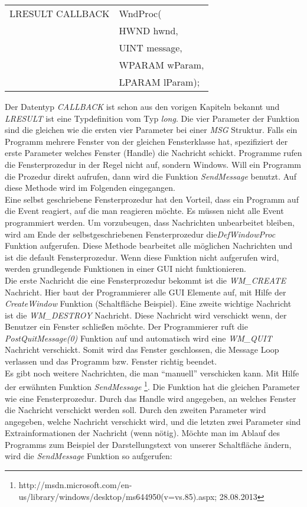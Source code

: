 \begin{tabular}{ll}
LRESULT CALLBACK & WndProc(\\
& HWND hwnd,\\
& UINT message,\\
& WPARAM wParam,\\
& LPARAM lParam);
\end{tabular}

Der Datentyp \textit{CALLBACK} ist schon aus den vorigen Kapiteln bekannt und \textit{LRESULT} ist eine Typdefinition vom Typ \textit{long}. Die vier Parameter der Funktion sind die gleichen wie die ersten vier Parameter bei einer \textit{MSG} Struktur. Falls ein Programm mehrere Fenster von der gleichen Fensterklasse hat, spezifiziert der erste Parameter welches Fenster (Handle) die Nachricht schickt. Programme rufen die Fensterprozedur in der Regel nicht auf, sondern Windows. Will ein Programm die Prozedur direkt aufrufen, dann wird die Funktion \textit{SendMessage} benutzt. Auf diese Methode wird im Folgenden eingegangen.
\\

Eine selbst geschriebene Fensterprozedur hat den Vorteil, dass ein Programm auf die Event reagiert, auf die man reagieren möchte. Es müssen nicht alle Event programmiert werden. Um vorzubeugen, dass Nachrichten unbearbeitet bleiben, wird am Ende der selbstgeschriebenen Fensterprozedur die\textit{DefWindowProc} Funktion aufgerufen. Diese Methode bearbeitet alle möglichen Nachrichten und ist die default Fensterprozedur. Wenn diese Funktion nicht aufgerufen wird, werden grundlegende Funktionen in einer GUI nicht funktionieren.
\\

Die erste Nachricht die eine Fensterprozedur bekommt ist die \textit{WM\_CREATE} Nachricht. Hier baut der Programmierer alle GUI Elemente auf, mit Hilfe der \textit{CreateWindow} Funktion (Schaltfläche Beispiel). Eine zweite wichtige Nachricht ist die \textit{WM\_DESTROY} Nachricht. Diese Nachricht wird verschickt wenn, der Benutzer ein Fenster schließen möchte. Der Programmierer ruft die \textit{PostQuitMessage(0)} Funktion auf und automatisch wird eine \textit{WM\_QUIT} Nachricht verschickt. Somit wird das Fenster geschlossen, die Message Loop verlassen und das Programm bzw. Fenster richtig beendet.
\\

Es gibt noch weitere Nachrichten, die man "`manuell"' verschicken kann. Mit Hilfe der erwähnten Funktion \textit{SendMessage} \footnote{http://msdn.microsoft.com/en-us/library/windows/desktop/ms644950(v=vs.85).aspx; 28.08.2013}. Die Funktion hat die gleichen Parameter wie eine Fensterprozedur. Durch das Handle wird angegeben, an welches Fenster die Nachricht verschickt werden soll. Durch den zweiten Parameter wird angegeben, welche Nachricht verschickt wird, und die letzten zwei Parameter sind Extrainformationen der Nachricht (wenn nötig). Möchte man im Ablauf des Programms zum Beispiel der Darstellungstext von unserer Schaltfläche ändern, wird die \textit{SendMessage} Funktion so aufgerufen:

